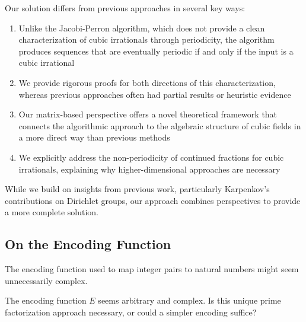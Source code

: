 \begin{response}
Our solution differs from previous approaches in several key ways:
\begin{enumerate}
    \item Unlike the Jacobi-Perron algorithm, which does not provide a clean characterization of cubic irrationals through periodicity, the \HAPD{} algorithm produces sequences that are eventually periodic if and only if the input is a cubic irrational
    
    \item We provide rigorous proofs for both directions of this characterization, whereas previous approaches often had partial results or heuristic evidence
    
    \item Our matrix-based perspective offers a novel theoretical framework that connects the algorithmic approach to the algebraic structure of cubic fields in a more direct way than previous methods
    
    \item We explicitly address the non-periodicity of continued fractions for cubic irrationals, explaining why higher-dimensional approaches are necessary
\end{enumerate}

While we build on insights from previous work, particularly Karpenkov's 
contributions on Dirichlet groups, our approach combines perspectives to 
provide a more complete solution.
\end{response}

\subsection{On the Encoding Function}

The encoding function used to map integer pairs to natural numbers might seem unnecessarily complex.

\begin{objection}
The encoding function $E$ seems arbitrary and complex. Is this unique prime factorization approach necessary, or could a simpler encoding suffice?
\end{objection}

